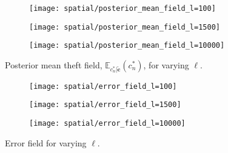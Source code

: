 \documentclass[11pt]{article}
\begin{document}
\begin{figure}
    \centering
    \begin{subfigure}{0.3\textwidth}
        \texttt{[image: spatial/posterior\_mean\_field\_l=100]}
        \label{fig:posterior_mean_field_l=100}
    \end{subfigure}    
    \begin{subfigure}{0.3\textwidth}
        \texttt{[image: spatial/posterior\_mean\_field\_l=1500]}
        \label{fig:posterior_mean_field_l=1500}
    \end{subfigure}    
    \begin{subfigure}{0.3\textwidth}
        \texttt{[image: spatial/posterior\_mean\_field\_l=10000]}
        \label{fig:posterior_mean_field_l=10000}
    \end{subfigure}
    \caption{Posterior mean theft field, $\mathbb{E}_{c_n^*|\tilde{\boldsymbol{c}}}(c_n^*)$, for varying $\ell$.}
    \label{fig:posterior_mean_field}
\end{figure}

\begin{figure}
    \centering
    \begin{subfigure}{0.3\textwidth}
        \texttt{[image: spatial/error\_field\_l=100]}
    \end{subfigure}    
    \begin{subfigure}{0.3\textwidth}
        \texttt{[image: spatial/error\_field\_l=1500]}
    \end{subfigure}    
    \begin{subfigure}{0.3\textwidth}
        \texttt{[image: spatial/error\_field\_l=10000]}
    \end{subfigure}
    \caption{Error field for varying $\ell$.}
    \label{fig:error_field}
\end{figure}
\end{document}
